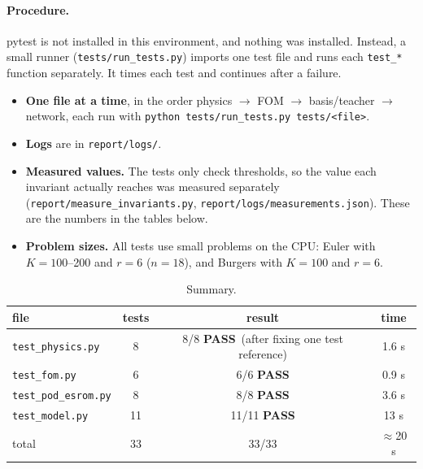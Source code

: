 \documentclass[11pt,a4paper]{article}
\newcommand{\code}[1]{\texttt{\small #1}}
\newcommand{\pass}{\textcolor{green!45!black}{\textbf{PASS}}}
\begin{document}
\paragraph{Procedure.} pytest is not installed in this environment, and nothing was installed. Instead, a small runner (\code{tests/run\_tests.py}) imports one test file and runs each \code{test\_*} function separately. It times each test and continues after a failure.
\begin{itemize}
\item \textbf{One file at a time}, in the order physics $\to$ FOM $\to$ basis/teacher $\to$ network, each run with \code{python tests/run\_tests.py tests/<file>}.
\item \textbf{Logs} are in \code{report/logs/}.
\item \textbf{Measured values.} The tests only check thresholds, so the value each invariant actually reaches was measured separately (\code{report/measure\_invariants.py}, \code{report/logs/measurements.json}). These are the numbers in the tables below.
\item \textbf{Problem sizes.} All tests use small problems on the CPU: Euler with $K=100$--200 and $r=6$ ($n=18$), and Burgers with $K=100$ and $r=6$.
\end{itemize}

\begin{table}[h]\centering
\caption{Summary.}
\begin{tabular}{lccc}
\toprule
file & tests & result & time\\\midrule
\code{test\_physics.py} & 8 & 8/8 \pass\ (after fixing one test reference) & 1.6 s\\
\code{test\_fom.py} & 6 & 6/6 \pass & 0.9 s\\
\code{test\_pod\_esrom.py} & 8 & 8/8 \pass & 3.6 s\\
\code{test\_model.py} & 11 & 11/11 \pass & 13 s\\\midrule
total & 33 & 33/33 & $\approx$20 s\\
\bottomrule
\end{tabular}
\end{table}
\end{document}
